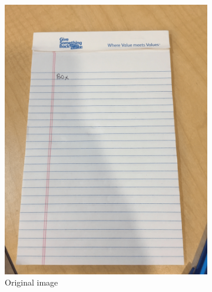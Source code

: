 \begin{figure}[H]
     \centering
     \captionsetup{justification=centering}
     \begin{subfigure}[t]{0.3\textwidth}
         \centering
         \includegraphics[width=\textwidth]{images/4_image/notepad.png}
         \caption{Original image}
         \label{fig:note_og}
     \end{subfigure}
     \hfill
     \begin{subfigure}[t]{0.3\textwidth}
         \centering

\end{subfigure}
\end{figure}

